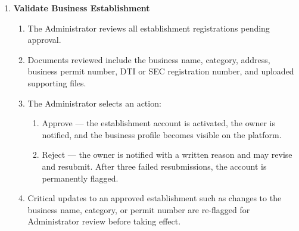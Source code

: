 \documentclass{research}
\begin{document}
\begin{enumerate}
    \item \textbf{Validate Business Establishment}
    \begin{enumerate}
        \item The Administrator reviews all establishment registrations 
        pending approval.
        \item Documents reviewed include the business name, category, 
        address, business permit number, DTI or SEC registration number, 
        and uploaded supporting files.
        \item The Administrator selects an action:
        \begin{enumerate}
            \item Approve --- the establishment account is activated, the 
            owner is notified, and the business profile becomes visible on 
            the platform.
            \item Reject --- the owner is notified with a written reason 
            and may revise and resubmit. After three failed resubmissions, 
            the account is permanently flagged.
        \end{enumerate}
        \item Critical updates to an approved establishment such as changes 
        to the business name, category, or permit number are re-flagged for 
        Administrator review before taking effect.
    \end{enumerate}


\end{enumerate}
\end{document}
